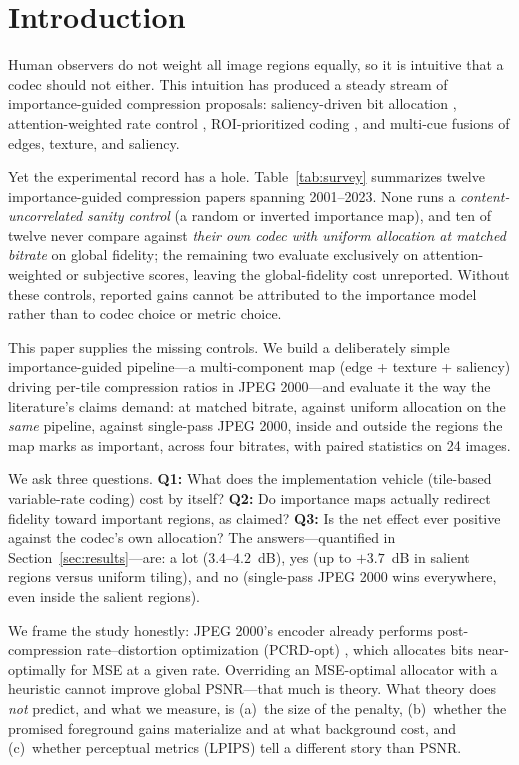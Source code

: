 \documentclass[conference]{IEEEtran}
\begin{document}
\section{Introduction}

Human observers do not weight all image regions equally, so it is intuitive
that a codec should not either. This intuition has produced a steady stream
of importance-guided compression proposals: saliency-driven bit allocation
\cite{guo2010visual,barua2015saliency}, attention-weighted rate control
\cite{li2011visual,kaur2020regional}, ROI-prioritized coding
\cite{christopoulos2000jpeg,cai2017closed}, and multi-cue fusions of edges,
texture, and saliency.

Yet the experimental record has a hole. Table~\ref{tab:survey} summarizes
twelve importance-guided compression papers spanning 2001--2023. None runs a
\emph{content-uncorrelated sanity control} (a random or inverted importance
map), and ten of twelve never compare against \emph{their own codec with
uniform allocation at matched bitrate} on global fidelity; the remaining two
evaluate exclusively on attention-weighted or subjective scores, leaving the
global-fidelity cost unreported. Without these controls, reported gains
cannot be attributed to the importance model rather than to codec choice or
metric choice.

This paper supplies the missing controls. We build a deliberately simple
importance-guided pipeline---a multi-component map (edge + texture +
saliency) driving per-tile compression ratios in JPEG 2000---and evaluate it
the way the literature's claims demand: at matched bitrate, against uniform
allocation on the \emph{same} pipeline, against single-pass JPEG 2000,
inside and outside the regions the map marks as important, across four
bitrates, with paired statistics on 24 images.

We ask three questions. \textbf{Q1:} What does the implementation vehicle
(tile-based variable-rate coding) cost by itself? \textbf{Q2:} Do importance
maps actually redirect fidelity toward important regions, as claimed?
\textbf{Q3:} Is the net effect ever positive against the codec's own
allocation? The answers---quantified in
Section~\ref{sec:results}---are: a lot ($3.4$--$4.2$~dB), yes (up to
$+3.7$~dB in salient regions versus uniform tiling), and no (single-pass
JPEG 2000 wins everywhere, even inside the salient regions).

We frame the study honestly: JPEG 2000's encoder already performs
post-compression rate--distortion optimization (PCRD-opt)
\cite{taubman2002jpeg2000}, which allocates bits near-optimally for MSE at a
given rate. Overriding an MSE-optimal allocator with a heuristic cannot
improve global PSNR---that much is theory. What theory does \emph{not}
predict, and what we measure, is (a)~the size of the penalty, (b)~whether
the promised foreground gains materialize and at what background cost, and
(c)~whether perceptual metrics (LPIPS) tell a different story than PSNR.
\end{document}
